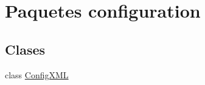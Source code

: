 \hypertarget{namespaceconfiguration}{}\section{Paquetes configuration}
\label{namespaceconfiguration}
\subsection*{Clases}
\begin{DoxyCompactItemize}
\item 
class \mbox{\hyperlink{classconfiguration_1_1_config_x_m_l}{Config\+X\+ML}}
\end{DoxyCompactItemize}
